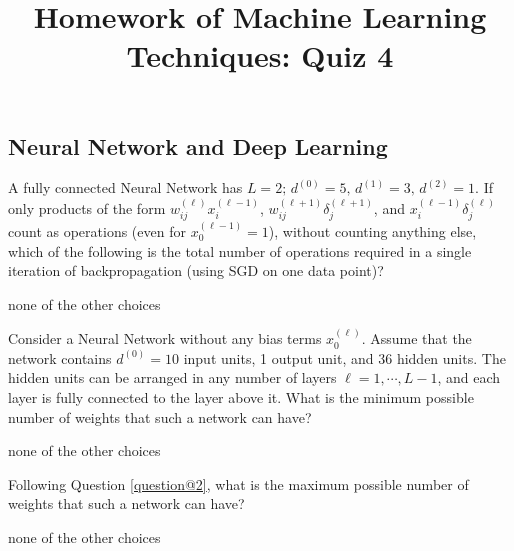 \documentclass[a4paper,10pt]{exam}
\title{Homework of Machine Learning Techniques: Quiz 4}
\date{}
\author{}
\begin{document}
\maketitle
\begin{questions}
	\section*{Neural Network and Deep Learning}
	\question
	A fully connected Neural Network has $L=2; \, d^{(0)}=5, \, d^{(1)}=3, \, d^{(2)}=1$. If only products of the form $w_{ij}^{(\ell)} x_i^{(\ell-1)}$, $w_{ij}^{(\ell+1)} \delta_j^{(\ell+1)}$, and $x_i^{(\ell-1)} \delta_j^{(\ell)}$ count as operations (even for $x_0^{(\ell-1)}=1$), without counting anything else, which of the following is the total number of operations required in a single iteration of backpropagation (using SGD on one data point)?
	\begin{checkboxes}
		\choice none of the other choices\\
	\end{checkboxes}

	\question Consider a Neural Network without any bias terms $x_{0}^{(\ell)}$. Assume that the network contains $d^{(0)}=10$ input units, 1 output unit, and 36 hidden units. The hidden units can be arranged in any number of layers $\ell=1,\cdots,L-1$, and each layer is fully connected to the layer above it. What is the minimum possible number of weights that such a network can have?
	\begin{checkboxes}
		\CorrectChoice 46
		\choice 44
		\choice none of the other choices
		\choice 43
		\choice 45\\
	\end{checkboxes}

	\question Following Question \ref{question@2}, what is the maximum possible number of weights that such a network can have?
	\begin{checkboxes}
		\choice 510
		\choice 520
		\CorrectChoice none of the other choices
		\choice 500
		\choice 490\\
	\end{checkboxes}


\end{questions}
\end{document}
